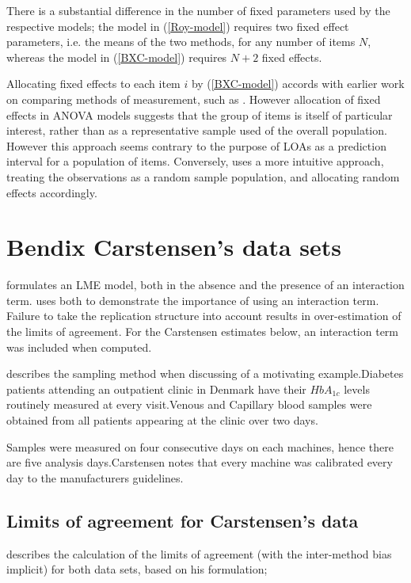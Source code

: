 \documentclass[12pt, a4paper]{report}
\theoremstyle{plain}
\theoremstyle{definition}
\theoremstyle{remark}
\begin{document}
There is a substantial difference in the number of fixed parameters used by the respective models; the model in (\ref{Roy-model}) requires two fixed effect parameters, i.e. the means of the two methods, for any number of items $N$, whereas the model in (\ref{BXC-model}) requires $N+2$ fixed effects.

Allocating fixed effects to each item $i$ by (\ref{BXC-model}) accords with earlier work on comparing methods of measurement, such as \citet{Grubbs48}. However allocation of fixed effects in ANOVA models suggests that the group of items is itself of particular interest, rather than as a representative sample used of the overall population. However this approach seems contrary to the purpose of LOAs as a prediction interval for a population of items. Conversely, \citet{roy}
uses a more intuitive approach, treating the observations as a random sample population, and allocating random effects accordingly.





\section{Bendix Carstensen's data sets}
\citet{BXC2008} formulates an LME model, both in the absence and the presence of an interaction term.\citet{bxc} uses both to demonstrate the importance of using an interaction term. Failure to take the replication structure into
account results in over-estimation of the limits of agreement. For the Carstensen estimates below, an interaction term was included when computed.

\citet{BXC2008} describes the sampling method when discussing of a motivating example.Diabetes patients attending an outpatient clinic in Denmark have their $HbA_{1c}$ levels routinely measured at every visit.Venous and Capillary blood samples were obtained from all patients appearing at the clinic over two days.

Samples were measured on four consecutive days on each machines, hence there are five analysis days.Carstensen notes that every machine was calibrated every day to  the manufacturers guidelines.


\subsection{Limits of agreement for Carstensen's data}


\citet{BXC2008} describes the calculation of the limits of agreement (with the inter-method bias implicit) for both data sets, based on his formulation;
\end{document}
